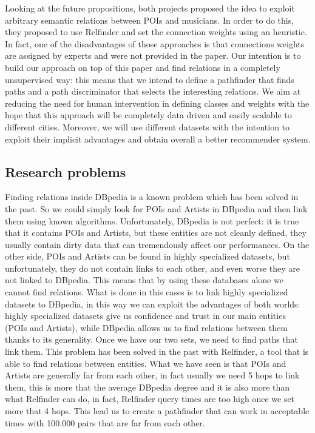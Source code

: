 \documentclass[paper=a4, fontsize=11pt]{scrartcl}
\begin{document}
Looking at the future propositions, both projects proposed the idea to exploit arbitrary semantic relations between POIs and musicians.
In order to do this, they proposed to use Relfinder \cite{Heim:2009:RRR:1695324.1695351} and set the connection weights using an heuristic. In fact, one of the disadvantages of those approaches is that connections weights are assigned by experts and were not provided in the paper.
Our intention is to build our approach on top of this paper and find relations in a completely unsupervised way: this means that we intend to define a pathfinder that finds paths and a path discriminator that selects the interesting relations. We aim at reducing the need for human intervention in defining classes and weights with the hope that this approach will be completely data driven and easily scalable to different cities. Moreover, we will use different datasets with the intention to exploit their implicit advantages and obtain overall a better recommender system.

\subsection{Research problems}
Finding relations inside DBpedia is a known problem which has been solved in the past. So we could simply look for POIs and Artists in DBpedia and then link them using known algorithms.
Unfortunately, DBpedia is not perfect: it is true that it contains POIs and Artists, but these entities are not cleanly defined, they usually contain dirty data that can tremendously affect our performances.
On the other side, POIs and Artists can be found in highly specialized datasets, but unfortunately, they do not contain links to each other, and even worse they are not linked to DBpedia. This means that by using these databases alone we cannot find relations.
What is done in this cases is to link highly specialized datasets to DBpedia, in this way we can exploit the advantages of both worlds: highly specialized datasets give us confidence and trust in our main entities (POIs and Artists), while DBpedia allows us to find relations between them thanks to its generality.
Once we have our two sets, we need to find paths that link them. This problem has been solved in the past with Relfinder, a tool that is able to find relations between entities.
What we have seen is that POIs and Artists are generally far from each other, in fact usually we need 5 hops to link them, this is more that the average DBpedia degree and it is also more than what Relfinder can do, in fact, Relfinder query times are too high once we set more that 4 hops. This lead us to create a pathfinder that can work in acceptable times with 100.000 pairs that are far from each other.
\end{document}
